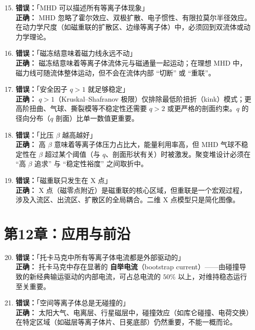 \begin{warning}
\begin{enumerate}
\setcounter{enumi}{14}
\item \textbf{错误：}「MHD 可以描述所有等离子体现象」\\
\textbf{正确：} MHD 忽略了霍尔效应、双极扩散、电子惯性、有限拉莫尔半径效应。在动力学尺度（如磁重联的扩散区、边缘等离子体）中，必须回到双流体或动力学理论。

\item \textbf{错误：}「磁冻结意味着磁力线永远不动」\\
\textbf{正确：} 磁冻结意味着等离子体流体元与磁通量一起运动；在理想 MHD 中，磁力线可随流体整体运动，但不会在流体内部 ``切断'' 或 ``重联''。

\item \textbf{错误：}「安全因子 $q>1$ 就足够稳定」\\
\textbf{正确：} $q>1$（Kruskal--Shafranov 极限）仅排除最低阶扭折（kink）模式；更高阶扭曲、气球、撕裂模等不稳定性还需要 $q>2$ 或更严格的剖面约束。$q$ 的径向分布（$q$ 剖面）比单一数值更重要。

\item \textbf{错误：}「比压 $\beta$ 越高越好」\\
\textbf{正确：} 高 $\beta$ 意味着等离子体压力占比大，能量利用率高，但 MHD 气球不稳定性在 $\beta$ 超过某个阈值（与 $q$、剖面形状有关）时被激发。聚变堆设计必须在 ``高 $\beta$ 追求'' 与 ``稳定性裕度'' 之间取折中。

\item \textbf{错误：}「磁重联只发生在 X 点」\\
\textbf{正确：} X 点（磁零点附近）是磁重联的核心区域，但重联是一个宏观过程，涉及入流区、出流区、扩散区的全局耦合。二维 X 点模型只是简化图像。
\end{enumerate}
\end{warning}


\section{第12章：应用与前沿}

\begin{warning}
\begin{enumerate}
\setcounter{enumi}{19}
\item \textbf{错误：}「托卡马克中所有等离子体电流都是外部驱动的」\\
\textbf{正确：} 托卡马克中存在显著的 \textbf{自举电流}（bootstrap current）——由碰撞导致的新经典输运驱动的内部电流，可占总电流的 $50\%$ 以上，对维持稳态运行至关重要。

\item \textbf{错误：}「空间等离子体总是无碰撞的」\\
\textbf{正确：} 太阳大气、电离层、行星磁层中，碰撞效应（如库仑碰撞、电荷交换）在特定区域（如磁层等离子体片、日冕底部）仍然重要，不能一概而论。
\end{enumerate}
\end{warning}


